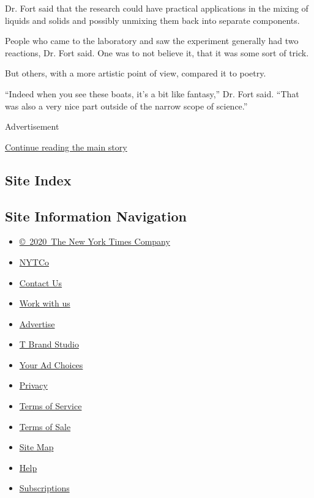 Dr. Fort said that the research could have practical applications in the
mixing of liquids and solids and possibly unmixing them back into
separate components.

People who came to the laboratory and saw the experiment generally had
two reactions, Dr. Fort said. One was to not believe it, that it was
some sort of trick.

But others, with a more artistic point of view, compared it to poetry.

``Indeed when you see these boats, it's a bit like fantasy,'' Dr. Fort
said. ``That was also a very nice part outside of the narrow scope of
science.''

Advertisement

\protect\hyperlink{after-bottom}{Continue reading the main story}

\hypertarget{site-index}{%
\subsection{Site Index}\label{site-index}}

\hypertarget{site-information-navigation}{%
\subsection{Site Information
Navigation}\label{site-information-navigation}}

\begin{itemize}
\tightlist
\item
  \href{https://help.nytimes3xbfgragh.onion/hc/en-us/articles/115014792127-Copyright-notice}{©~2020~The
  New York Times Company}
\end{itemize}

\begin{itemize}
\tightlist
\item
  \href{https://www.nytco.com/}{NYTCo}
\item
  \href{https://help.nytimes3xbfgragh.onion/hc/en-us/articles/115015385887-Contact-Us}{Contact
  Us}
\item
  \href{https://www.nytco.com/careers/}{Work with us}
\item
  \href{https://nytmediakit.com/}{Advertise}
\item
  \href{http://www.tbrandstudio.com/}{T Brand Studio}
\item
  \href{https://www.nytimes3xbfgragh.onion/privacy/cookie-policy\#how-do-i-manage-trackers}{Your
  Ad Choices}
\item
  \href{https://www.nytimes3xbfgragh.onion/privacy}{Privacy}
\item
  \href{https://help.nytimes3xbfgragh.onion/hc/en-us/articles/115014893428-Terms-of-service}{Terms
  of Service}
\item
  \href{https://help.nytimes3xbfgragh.onion/hc/en-us/articles/115014893968-Terms-of-sale}{Terms
  of Sale}
\item
  \href{https://spiderbites.nytimes3xbfgragh.onion}{Site Map}
\item
  \href{https://help.nytimes3xbfgragh.onion/hc/en-us}{Help}
\item
  \href{https://www.nytimes3xbfgragh.onion/subscription?campaignId=37WXW}{Subscriptions}
\end{itemize}
